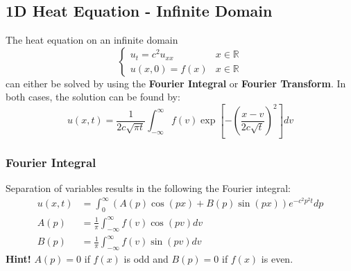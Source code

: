 \subsection{1D Heat Equation - Infinite Domain}\label{ssec:1d_heat_inf}
The heat equation on an infinite domain
\begin{equation*}
    \begin{cases}
        u_t=c^2u_{xx} & x\in \mathbb{R} \\
        u(x,0)=f(x)   & x\in \mathbb{R}
    \end{cases}
\end{equation*}
can either be solved by using the \textbf{Fourier Integral} or \textbf{Fourier Transform}.
In both cases, the solution can be found by:
\begin{equation*}
    u(x,t)=\frac{1}{2c\sqrt{\pi t}}\int_{-\infty}^{\infty}f(v)\exp\left[-{\left(\frac{x-v}{2c\sqrt{t}}\right)}^{2}\right]dv
\end{equation*}


\subsubsection{Fourier Integral}
Separation of variables results in the following the Fourier integral:
\begin{align*}
    u(x,t) & =\int_0^\infty(A(p)\cos(px)+B(p)\sin(px))e^{-c^2p^2t}dp \\
    A(p)   & =\frac1\pi\int_{-\infty}^\infty f(v)\cos(pv)dv          \\
    B(p)   & =\frac1\pi\int_{-\infty}^\infty f(v)\sin(pv)dv
\end{align*}
\textbf{Hint!} $A(p)=0$ if $f(x)$ is odd and $B(p)=0$ if $f(x)$ is even.


